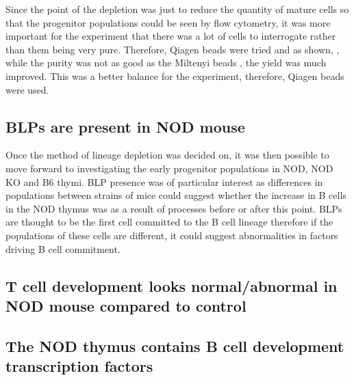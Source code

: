 Since the point of the depletion was just to reduce the quantity of mature cells so that the progenitor populations could be seen by flow cytometry, it was more important for the experiment that there was a lot of cells to interrogate rather than them being very pure.
Therefore, Qiagen beads were tried and as shown, , while the purity was not as good as the Miltenyi beads , the yield was much improved.
This was a better balance for the experiment, therefore, Qiagen beads were used.


\subsection{BLPs are present in NOD mouse}


Once the method of lineage depletion was decided on, it was then possible to move forward to investigating the early progenitor populations in NOD, NOD KO and B6 thymi.
BLP presence was of particular interest as differences in populations between strains of mice could suggest whether the increase in B cells in the NOD thymus was as a result of processes before or after this point.
BLPs are thought to be the first cell committed to the B cell lineage therefore if the populations of these cells are different, it could suggest abnormalities in factors driving B cell commitment.



\subsection{T cell development looks normal/abnormal in NOD mouse compared to control}


\subsection{The NOD thymus contains B cell development transcription factors}


